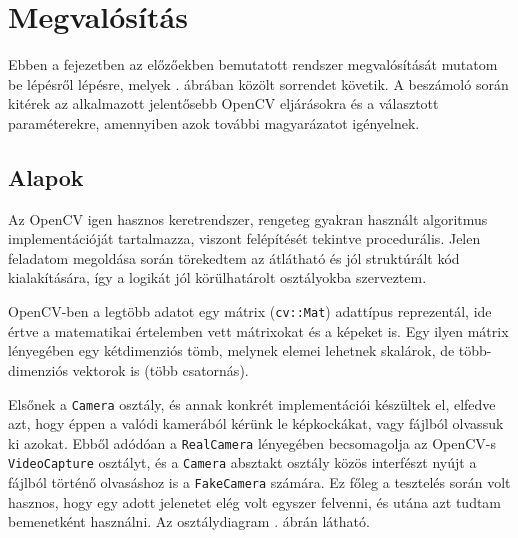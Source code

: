 \chapter{Megvalósítás}


Ebben a fejezetben az előzőekben bemutatott rendszer megvalósítását mutatom be lépésről lépésre, melyek . ábrában közölt sorrendet követik. A beszámoló során kitérek az alkalmazott jelentősebb OpenCV eljárásokra és a választott paraméterekre, amennyiben azok további magyarázatot igényelnek. 


\section{Alapok}



Az OpenCV igen hasznos keretrendszer, rengeteg gyakran használt algoritmus implementációját tartalmazza, viszont felépítését tekintve procedurális. Jelen feladatom megoldása során törekedtem az átlátható és jól struktúrált kód kialakítására, így a logikát jól körülhatárolt osztályokba szerveztem.

OpenCV-ben a legtöbb adatot egy mátrix (\texttt{cv::Mat}) adattípus reprezentál, ide értve a matematikai értelemben vett mátrixokat és a képeket is. Egy ilyen mátrix lényegében egy kétdimenziós tömb, melynek elemei lehetnek skalárok, de több-dimenziós vektorok is (több csatornás).

Elsőnek a \texttt{Camera} osztály, és annak konkrét implementációi készültek el, elfedve azt, hogy éppen a valódi kamerából kérünk le képkockákat, vagy fájlból olvassuk ki azokat. Ebből adódóan a \texttt{RealCamera} lényegében becsomagolja az OpenCV-s \texttt{VideoCapture} osztályt, és a \texttt{Camera} absztakt osztály közös interfészt nyújt a fájlból történő olvasáshoz is a \texttt{FakeCamera} számára. Ez főleg a tesztelés során volt hasznos, hogy egy adott jelenetet elég volt egyszer felvenni, és utána azt tudtam bemenetként használni. Az osztálydiagram . ábrán látható.

